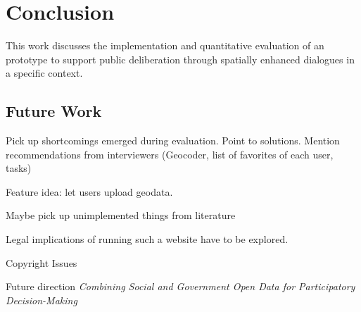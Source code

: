 \section{Conclusion}
\label{chap:conclusion}

This work discusses the implementation and quantitative evaluation of an prototype to support public deliberation through spatially enhanced dialogues in a specific context.

\subsection{Future Work}
Pick up shortcomings emerged during evaluation. Point to solutions. Mention recommendations from interviewers (Geocoder, list of favorites of each user, tasks)

Feature idea: let users upload geodata.

Maybe pick up unimplemented things from literature

Legal implications of running such a website have to be explored.

Copyright Issues \cite{Carver2001_PPGIS_Cyberdemocracy}


Future direction \textit{Combining Social and Government Open Data for Participatory Decision-Making}